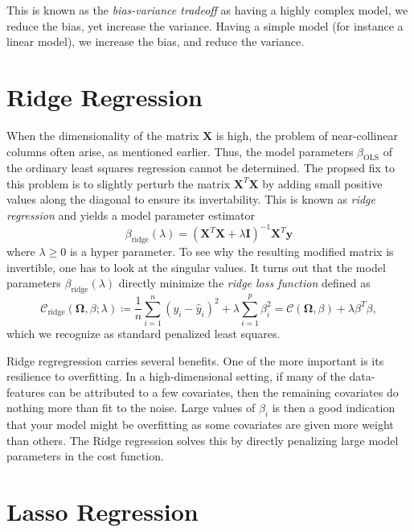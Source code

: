\documentclass[dvipsnames, article, a4paper, oneside, 12pt]{memoir}
\newcommand{\X}{\bm{X}}
\newcommand{\OLS}{\mathrm{OLS}}
\newcommand{\ridge}{\mathrm{ridge}}
\newcommand{\mat}[1]{\bm{#1}}
\newcommand{\y}{\bm{y}}
\newcommand{\data}{\bm{\Omega}}
\newcommand{\cost}{\mathcal{C}}
\begin{document}
  This is known as the \emph{bias-variance tradeoff} as having a highly complex
  model, we reduce the bias, yet increase the variance.  Having a simple model
  (for instance a linear model), we increase the bias, and reduce the variance.


  \section{Ridge Regression}
  
  When the dimensionality of the matrix \( \X \) is high, the problem of
  near-collinear columns often arise, as mentioned earlier. Thus, the model
  parameters \( \beta_{\OLS} \) of the ordinary least squares regression cannot
  be determined. The propsed fix to this problem is to slightly perturb the
  matrix \( \X^T \X \) by adding small positive values along the diagonal to
  ensure its invertability. This is known as \emph{ridge regression} and yields
  a model parameter estimator
  \begin{equation}
    \beta_{\ridge}(\lambda) = (\X^T\X + \lambda\mat{I})^{-1}\X^T\y
  \end{equation}
  where \( \lambda \geq 0 \) is a hyper parameter. To see why the resulting
  modified matrix is invertible, one has to look at the singular values.  It
  turns out that the model parameters \( \beta_{\ridge}(\lambda) \) directly
  minimize the \emph{ridge loss function} defined as
  \begin{equation}
    \cost_{\ridge}(\data, \beta;  \lambda) \coloneqq \frac{1}{n} \sum_{i=1}^n
    (y_i - \hat{y}_i)^2 + \lambda \sum_{i=1}^p \beta_i^2 = \cost(\data, \beta)
    + \lambda \beta^T \beta,
  \end{equation}
  which we recognize as standard penalized least squares.
  
  Ridge regregression carries several benefits. One of the more important is
  its resilience to overfitting. In a high-dimensional setting, if many of the
  data-features can be attributed to a few covariates, then the remaining
  covariates do nothing more than fit to the noise. Large values of \( \beta_i
  \) is then a good indication that your model might be overfitting as some
  covariates are given more weight than others.  The Ridge regression solves
  this by directly penalizing large model parameters in the cost function. 
  
  \section{Lasso Regression}
\end{document}
